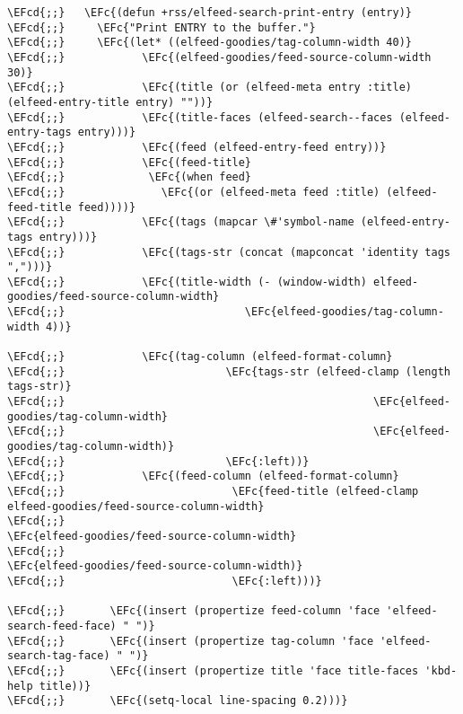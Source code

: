 \documentclass[12pt]{article}
\theoremstyle{plain}%
\theoremstyle{definition}
\theoremstyle{remark}
\newcommand{\EFc}[1]{\textcolor{EFc}{#1}} %
\newcommand{\EFcd}[1]{\textcolor{EFcd}{#1}} %
\begin{document}
\begin{Code}
\begin{Verbatim}
\EFcd{;;}   \EFc{(defun +rss/elfeed-search-print-entry (entry)}
\EFcd{;;}     \EFc{"Print ENTRY to the buffer."}
\EFcd{;;}     \EFc{(let* ((elfeed-goodies/tag-column-width 40)}
\EFcd{;;}            \EFc{(elfeed-goodies/feed-source-column-width 30)}
\EFcd{;;}            \EFc{(title (or (elfeed-meta entry :title) (elfeed-entry-title entry) ""))}
\EFcd{;;}            \EFc{(title-faces (elfeed-search--faces (elfeed-entry-tags entry)))}
\EFcd{;;}            \EFc{(feed (elfeed-entry-feed entry))}
\EFcd{;;}            \EFc{(feed-title}
\EFcd{;;}             \EFc{(when feed}
\EFcd{;;}               \EFc{(or (elfeed-meta feed :title) (elfeed-feed-title feed))))}
\EFcd{;;}            \EFc{(tags (mapcar \#'symbol-name (elfeed-entry-tags entry)))}
\EFcd{;;}            \EFc{(tags-str (concat (mapconcat 'identity tags ",")))}
\EFcd{;;}            \EFc{(title-width (- (window-width) elfeed-goodies/feed-source-column-width}
\EFcd{;;}                            \EFc{elfeed-goodies/tag-column-width 4))}

\EFcd{;;}            \EFc{(tag-column (elfeed-format-column}
\EFcd{;;}                         \EFc{tags-str (elfeed-clamp (length tags-str)}
\EFcd{;;}                                                \EFc{elfeed-goodies/tag-column-width}
\EFcd{;;}                                                \EFc{elfeed-goodies/tag-column-width)}
\EFcd{;;}                         \EFc{:left))}
\EFcd{;;}            \EFc{(feed-column (elfeed-format-column}
\EFcd{;;}                          \EFc{feed-title (elfeed-clamp elfeed-goodies/feed-source-column-width}
\EFcd{;;}                                                   \EFc{elfeed-goodies/feed-source-column-width}
\EFcd{;;}                                                   \EFc{elfeed-goodies/feed-source-column-width)}
\EFcd{;;}                          \EFc{:left)))}

\EFcd{;;}       \EFc{(insert (propertize feed-column 'face 'elfeed-search-feed-face) " ")}
\EFcd{;;}       \EFc{(insert (propertize tag-column 'face 'elfeed-search-tag-face) " ")}
\EFcd{;;}       \EFc{(insert (propertize title 'face title-faces 'kbd-help title))}
\EFcd{;;}       \EFc{(setq-local line-spacing 0.2)))}


\end{Verbatim}
\end{Code}
\end{document}
